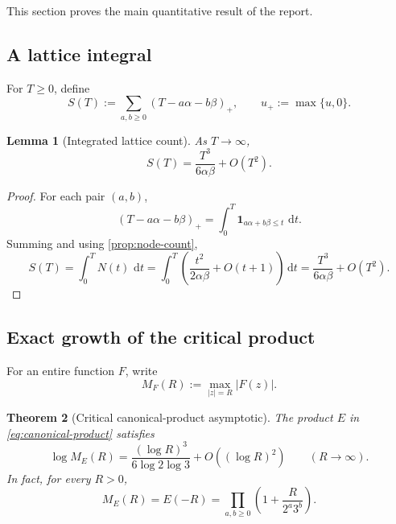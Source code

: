 \documentclass[11pt,oneside]{article}
\newtheorem{theorem}{Theorem}[section]
\newtheorem{lemma}[theorem]{Lemma}
\theoremstyle{definition}
\theoremstyle{remark}
\newcommand{\dd}{\,\mathrm d}
\begin{document}
This section proves the main quantitative result of the report.

\subsection{A lattice integral}

For \(T\ge0\), define
\begin{equation}
  S(T):=\sum_{a,b\ge0}
  (T-a\alpha-b\beta)_+,
  \qquad u_+:=\max\{u,0\}.
  \label{eq:ST}
\end{equation}

\begin{lemma}[Integrated lattice count]
\label{lem:integrated-count}
As \(T\to\infty\),
\begin{equation}
  S(T)=\frac{T^3}{6\alpha\beta}+O(T^2).
  \label{eq:ST-asymp}
\end{equation}
\end{lemma}

\begin{proof}
For each pair \((a,b)\),
\[
  (T-a\alpha-b\beta)_+
  =\int_0^T\mathbf 1_{a\alpha+b\beta\le t}\,\dd t.
\]
Summing and using \cref{prop:node-count},
\[
  S(T)=\int_0^T N(t)\,\dd t
  =\int_0^T\left(\frac{t^2}{2\alpha\beta}+O(t+1)\right)\dd t
  =\frac{T^3}{6\alpha\beta}+O(T^2).
\]
\end{proof}

\subsection{Exact growth of the critical product}

For an entire function \(F\), write
\[
  M_F(R):=\max_{|z|=R}|F(z)|.
\]

\begin{theorem}[Critical canonical-product asymptotic]
\label{thm:E-growth}
The product \(E\) in \eqref{eq:canonical-product} satisfies
\begin{equation}
  \log M_E(R)
  =\frac{(\log R)^3}{6\log2\log3}
   +O((\log R)^2)
  \qquad(R\to\infty).
  \label{eq:E-growth}
\end{equation}
In fact, for every \(R>0\),
\[
  M_E(R)=E(-R)
  =\prod_{a,b\ge0}\left(1+\frac{R}{2^a3^b}\right).
\]
\end{theorem}
\end{document}
